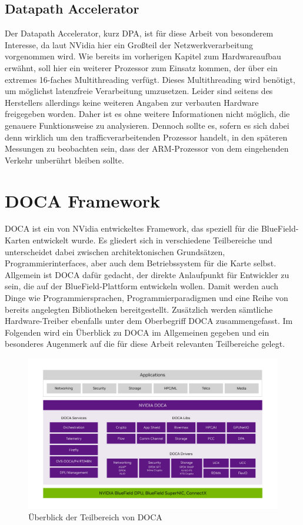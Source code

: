 \subsection{Datapath Accelerator}
Der Datapath Accelerator, kurz DPA, ist für diese Arbeit von besonderem Interesse, da laut NVidia hier ein Großteil der Netzwerkverarbeitung vorgenommen wird. Wie bereits im vorherigen Kapitel zum Hardwareaufbau erwähnt, soll hier ein weiterer Prozessor zum Einsatz kommen, der über ein extremes 16-faches Multithreading verfügt. Dieses Multithreading wird benötigt, um möglichst latenzfreie Verarbeitung umzusetzen. Leider sind seitens des Herstellers allerdings keine weiteren Angaben zur verbauten Hardware freigegeben worden. Daher ist es ohne weitere Informationen nicht möglich, die genauere Funktionsweise zu analysieren. Dennoch sollte es, sofern es sich dabei denn wirklich um den trafficverarbeitenden Prozessor handelt, in den späteren Messungen zu beobachten sein, dass der ARM-Prozessor von dem eingehenden Verkehr unberührt bleiben sollte.

\section{DOCA Framework}
DOCA ist ein von NVidia entwickeltes Framework, das speziell für die BlueField-Karten entwickelt wurde. Es gliedert sich in verschiedene Teilbereiche und unterscheidet dabei zwischen architektonischen Grundsätzen, Programmierinterfaces, aber auch dem Betriebssystem für die Karte selbst. Allgemein ist DOCA dafür gedacht, der direkte Anlaufpunkt für Entwickler zu sein, die auf der BlueField-Plattform entwickeln wollen. Damit werden auch Dinge wie Programmiersprachen, Programmierparadigmen und eine Reihe von bereits angelegten Bibliotheken bereitgestellt. Zusätzlich werden sämtliche Hardware-Treiber ebenfalls unter dem Oberbegriff DOCA zusammengefasst. Im Folgenden wird ein Überblick zu DOCA im Allgemeinen gegeben und ein besonderes Augenmerk auf die für diese Arbeit relevanten Teilbereiche gelegt.
\begin{figure}
    \centering
    \includegraphics[width=1\linewidth]{images/Screenshot 2025-04-26 at 08-31-41 DOCA Overview - NVIDIA Docs.png}
    \caption{Überblick der Teilbereich von DOCA}
    \label{fig:enter-label}
\end{figure}
